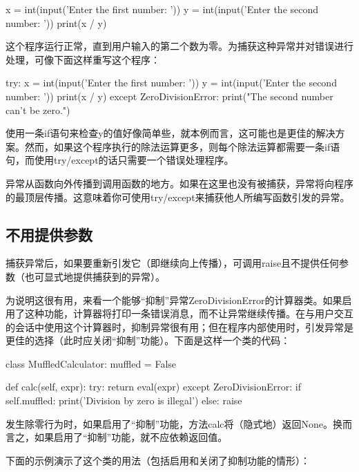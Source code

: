\begin{pyc}
x = int(input('Enter the first number: '))
y = int(input('Enter the second number: '))
print(x / y)
\end{pyc}
这个程序运行正常，直到用户输入的第二个数为零。为捕获这种异常并对错误进行处理，可像下面这样重写这个程序：

\begin{pyc}
try:
    x = int(input('Enter the first number: '))
    y = int(input('Enter the second number: '))
    print(x / y)
except ZeroDivisionError:
    print("The second number can't be zero.")
\end{pyc}
使用一条if语句来检查y的值好像简单些，就本例而言，这可能也是更佳的解决方案。然而，如果这个程序执行的除法运算更多，则每个除法运算都需要一条if语句，而使用try/except的话只需要一个错误处理程序。

\begin{tcolorbox}
异常从函数向外传播到调用函数的地方。如果在这里也没有被捕获，异常将向程序的最顶层传播。这意味着你可使用try/except来捕获他人所编写函数引发的异常。
\end{tcolorbox}
\subsection{不用提供参数}
捕获异常后，如果要重新引发它（即继续向上传播），可调用raise且不提供任何参数（也可显式地提供捕获到的异常）。

为说明这很有用，来看一个能够“抑制”异常ZeroDivisionError的计算器类。如果启用了这种功能，计算器将打印一条错误消息，而不让异常继续传播。在与用户交互的会话中使用这个计算器时，抑制异常很有用；但在程序内部使用时，引发异常是更佳的选择（此时应关闭“抑制”功能）。下面是这样一个类的代码：

\begin{pyc}
class MuffledCalculator:
    muffled = False

    def calc(self, expr):
        try:
            return eval(expr)
        except ZeroDivisionError:
            if self.muffled:
                print('Division by zero is illegal')
            else:
                raise
\end{pyc}

\begin{tcolorbox}
发生除零行为时，如果启用了“抑制”功能，方法calc将（隐式地）返回None。换而言之，如果启用了“抑制”功能，就不应依赖返回值。
\end{tcolorbox}

下面的示例演示了这个类的用法（包括启用和关闭了抑制功能的情形）：

